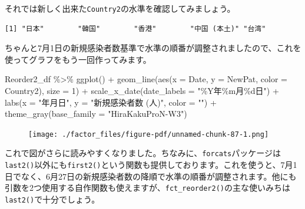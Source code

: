 \documentclass[
  a4paper,
  pandoc,
  ja=standard,
  jafont=haranoaji]{bxjsbook}
\newenvironment{Shaded}{\begin{snugshade}}{\end{snugshade}}
\newcommand{\AttributeTok}[1]{\textcolor[rgb]{0.00,0.48,0.65}{#1}}
\newcommand{\DecValTok}[1]{\textcolor[rgb]{0.68,0.00,0.00}{#1}}
\newcommand{\FunctionTok}[1]{\textcolor[rgb]{0.28,0.35,0.67}{#1}}
\newcommand{\NormalTok}[1]{\textcolor[rgb]{0.00,0.48,0.65}{#1}}
\newcommand{\SpecialCharTok}[1]{\textcolor[rgb]{0.37,0.37,0.37}{#1}}
\newcommand{\StringTok}[1]{\textcolor[rgb]{0.13,0.47,0.30}{#1}}
\begin{document}
それでは新しく出来た\texttt{Country2}の水準を確認してみましょう。

\begin{Shaded}
\end{Shaded}

\begin{verbatim}
[1] "日本"        "韓国"        "香港"        "中国 (本土)" "台湾"       
\end{verbatim}

ちゃんと7月1日の新規感染者数基準で水準の順番が調整されましたので、これを使ってグラフをもう一回作ってみます。

\begin{Shaded}
\begin{Highlighting}[numbers=left,,]
\NormalTok{Reorder2\_df }\SpecialCharTok{\%\textgreater{}\%}
  \FunctionTok{ggplot}\NormalTok{() }\SpecialCharTok{+}
  \FunctionTok{geom\_line}\NormalTok{(}\FunctionTok{aes}\NormalTok{(}\AttributeTok{x =}\NormalTok{ Date, }\AttributeTok{y =}\NormalTok{ NewPat, }\AttributeTok{color =}\NormalTok{ Country2),}
            \AttributeTok{size =} \DecValTok{1}\NormalTok{) }\SpecialCharTok{+}
  \FunctionTok{scale\_x\_date}\NormalTok{(}\AttributeTok{date\_labels =} \StringTok{"\%Y年\%m月\%d日"}\NormalTok{) }\SpecialCharTok{+}
  \FunctionTok{labs}\NormalTok{(}\AttributeTok{x =} \StringTok{"年月日"}\NormalTok{, }\AttributeTok{y =} \StringTok{"新規感染者数 (人)"}\NormalTok{, }\AttributeTok{color =} \StringTok{""}\NormalTok{) }\SpecialCharTok{+}
  \FunctionTok{theme\_gray}\NormalTok{(}\AttributeTok{base\_family =} \StringTok{"HiraKakuProN{-}W3"}\NormalTok{)}
\end{Highlighting}
\end{Shaded}

\begin{figure}[H]

{\centering \texttt{[image: ./factor\_files/figure-pdf/unnamed-chunk-87-1.png]}

}

\end{figure}

これで図がさらに読みやすくなりました。ちなみに、\texttt{forcats}パッケージは\texttt{last2()}以外にも\texttt{first2()}という関数も提供しております。これを使うと、7月1日でなく、6月27日の新規感染者数の降順で水準の順番が調整されます。他にも引数を2つ使用する自作関数も使えますが、\texttt{fct\_reorder2()}の主な使いみちは\texttt{last2()}で十分でしょう。
\end{document}

